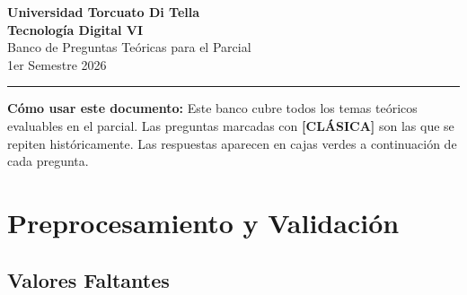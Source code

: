 \documentclass[11pt,a4paper]{article}
\begin{document}
\begin{center}
  {\Large\bfseries\color{tdblue} Universidad Torcuato Di Tella}\\[6pt]
  {\large\bfseries Tecnolog\'ia Digital VI}\\[4pt]
  {\large Banco de Preguntas Te\'oricas para el Parcial}\\[4pt]
  {\normalsize 1er Semestre 2026}\\[12pt]
  \rule{\linewidth}{1.5pt}
\end{center}

\begin{mdframed}[linecolor=tdorange, linewidth=1.5pt, roundcorner=4pt,
  backgroundcolor=lightyellow]
\textbf{C\'omo usar este documento:} Este banco cubre todos los temas te\'oricos
evaluables en el parcial. Las preguntas marcadas con
\textcolor{tdred}{\textbf{[CL\'ASICA]}} son las que se repiten hist\'oricamente.
Las respuestas aparecen en cajas verdes a continuaci\'on de cada pregunta.
\end{mdframed}

\vspace{0.5cm}
\tableofcontents
\newpage

\section{Preprocesamiento y Validaci\'on}

\subsection{Valores Faltantes}
\end{document}

